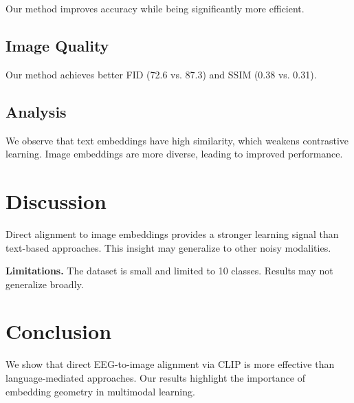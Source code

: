 Our method improves accuracy while being significantly more efficient.

\subsection{Image Quality}

Our method achieves better FID (72.6 vs. 87.3) and SSIM (0.38 vs. 0.31).

\subsection{Analysis}

We observe that text embeddings have high similarity, which weakens contrastive learning. Image embeddings are more diverse, leading to improved performance.

\section{Discussion}

Direct alignment to image embeddings provides a stronger learning signal than text-based approaches. This insight may generalize to other noisy modalities.

\textbf{Limitations.}
The dataset is small and limited to 10 classes. Results may not generalize broadly.

\section{Conclusion}

We show that direct EEG-to-image alignment via CLIP is more effective than language-mediated approaches. Our results highlight the importance of embedding geometry in multimodal learning.


